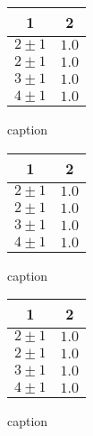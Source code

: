 \begin{figure}[htbp]
   \centering
   \parbox{0.31666666666666665\linewidth}{\centering
      \begin{tabular}{c c}
         \hline1   & 2     \\
         \hline
         $2 \pm 1$ & $1.0$ \\
         $2 \pm 1$ & $1.0$ \\
         $3 \pm 1$ & $1.0$ \\
         $4 \pm 1$ & $1.0$ \\
         \hline\end{tabular}
      \caption{caption}
   }\quad\parbox{0.31666666666666665\linewidth}{\centering
      \begin{tabular}{c c}
         \hline1   & 2     \\
         \hline
         $2 \pm 1$ & $1.0$ \\
         $2 \pm 1$ & $1.0$ \\
         $3 \pm 1$ & $1.0$ \\
         $4 \pm 1$ & $1.0$ \\
         \hline\end{tabular}
      \caption{caption}
   }\quad\parbox{0.31666666666666665\linewidth}{\centering
      \begin{tabular}{c c}
         \hline1   & 2     \\
         \hline
         $2 \pm 1$ & $1.0$ \\
         $2 \pm 1$ & $1.0$ \\
         $3 \pm 1$ & $1.0$ \\
         $4 \pm 1$ & $1.0$ \\
         \hline\end{tabular}
      \caption{caption}
   }\end{figure}